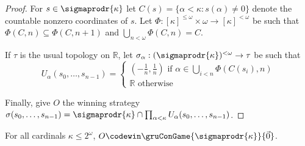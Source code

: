 \begin{proof}
For $s\in\sigmaprodr{\kappa}$ let $C(s)=\{\alpha<\kappa:s(\alpha)\not=0\}$ denote the countable nonzero coordinates of $s$. Let $\Phi:[\kappa]^{\leq\omega}\times\omega\to[\kappa]^{<\omega}$ be such that $\Phi(C,n)\subseteq\Phi(C,n+1)$ and $\bigcup_{n<\omega}\Phi(C,n)=C$.

If $\tau$ is the usual topology on $\mathbb{R}$, let $\sigma_\alpha:(\sigmaprodr{\kappa})^{<\omega}\to\tau$ be such that
\[
U_\alpha(s_0,\dots,s_{n-1})=\left\{
\begin{array}{l}
(-\frac{1}{n},\frac{1}{n}) \text{ if } \alpha\in\bigcup_{i<n}\Phi(C(s_i),n) \\
\mathbb{R} \text{ otherwise}
\end{array}
\right.
\]

Finally, give $O$ the winning strategy $\sigma(s_0,\dots,s_{n-1})=\sigmaprodr{\kappa}\cap\prod_{\alpha<\kappa}U_\alpha(s_0,\dots,s_{n-1})$.
\end{proof}

\begin{thm}
For all cardinals $\kappa\leq 2^\omega$, $O\codewin\gruConGame{\sigmaprodr{\kappa}}{\vec{0}}$.
\end{thm}

